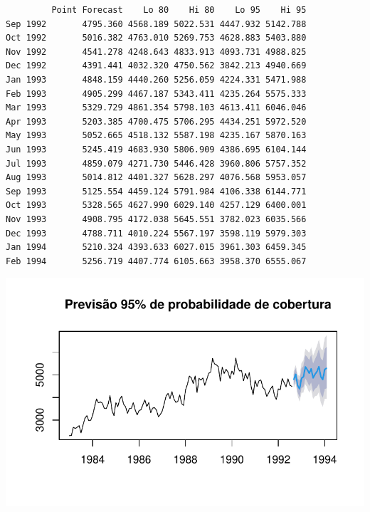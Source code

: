 \documentclass[
  letterpaper,
  DIV=11,
  numbers=noendperiod]{scrartcl}
\begin{document}
\begin{verbatim}
         Point Forecast    Lo 80    Hi 80    Lo 95    Hi 95
Sep 1992       4795.360 4568.189 5022.531 4447.932 5142.788
Oct 1992       5016.382 4763.010 5269.753 4628.883 5403.880
Nov 1992       4541.278 4248.643 4833.913 4093.731 4988.825
Dec 1992       4391.441 4032.320 4750.562 3842.213 4940.669
Jan 1993       4848.159 4440.260 5256.059 4224.331 5471.988
Feb 1993       4905.299 4467.187 5343.411 4235.264 5575.333
Mar 1993       5329.729 4861.354 5798.103 4613.411 6046.046
Apr 1993       5203.385 4700.475 5706.295 4434.251 5972.520
May 1993       5052.665 4518.132 5587.198 4235.167 5870.163
Jun 1993       5245.419 4683.930 5806.909 4386.695 6104.144
Jul 1993       4859.079 4271.730 5446.428 3960.806 5757.352
Aug 1993       5014.812 4401.327 5628.297 4076.568 5953.057
Sep 1993       5125.554 4459.124 5791.984 4106.338 6144.771
Oct 1993       5328.565 4627.990 6029.140 4257.129 6400.001
Nov 1993       4908.795 4172.038 5645.551 3782.023 6035.566
Dec 1993       4788.711 4010.224 5567.197 3598.119 5979.303
Jan 1994       5210.324 4393.633 6027.015 3961.303 6459.345
Feb 1994       5256.719 4407.774 6105.663 3958.370 6555.067
\end{verbatim}

\includegraphics{T2_grupo5_files/figure-pdf/previsao-pontual-2.pdf}
\end{document}
